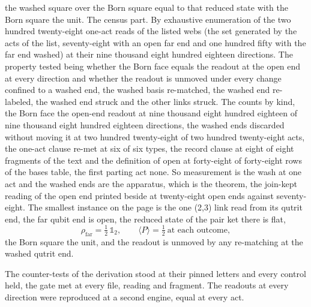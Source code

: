 \begin{chproof}
the washed square over the Born square equal to that reduced state with the Born square the unit. The census part. By exhaustive enumeration of the two hundred twenty-eight one-act reads of the listed webs (the set generated by the acts of the list, seventy-eight with an open far end and one hundred fifty with the far end washed) at their nine thousand eight hundred eighteen directions. The property tested being whether the Born face equals the readout at the open end at every direction and whether the readout is unmoved under every change confined to a washed end, the washed basis re-matched, the washed end re-labeled, the washed end struck and the other links struck. The counts by kind, the Born face the open-end readout at nine thousand eight hundred eighteen of nine thousand eight hundred eighteen directions, the washed ends discarded without moving it at two hundred twenty-eight of two hundred twenty-eight acts, the one-act clause re-met at six of six types, the record clause at eight of eight fragments of the text and the definition of open at forty-eight of forty-eight rows of the bases table, the first parting act none. So measurement is the wash at one act and the washed ends are the apparatus, which is the theorem, the join-kept reading of the open end printed beside at twenty-eight open ends against seventy-eight. The smallest instance on the page is the one (2,3) link read from its qutrit end, the far qubit end is open, the reduced state of the pair ket there is flat,
\begin{equation}
\rho_{\text{far}} = \tfrac12\,\mathbb{1}_{2},\qquad \langle P\rangle = \tfrac12 \ \text{at each outcome},
\end{equation}
the Born square the unit, and the readout is unmoved by any re-matching at the washed qutrit end.

The counter-tests of the derivation stood at their pinned letters and every control held, the gate met at every file, reading and fragment. The readouts at every direction were reproduced at a second engine, equal at every act.
\end{chproof}
